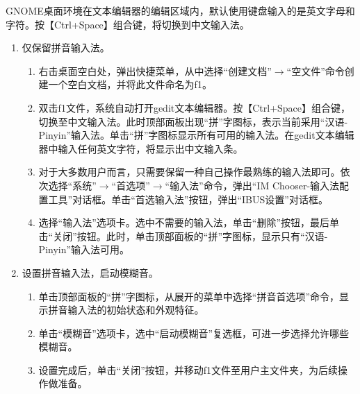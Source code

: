 GNOME桌面环境在文本编辑器的编辑区域内，默认使用键盘输入的是英文字母和字符。按【Ctrl+Space】组合键，将切换到中文输入法。
\begin{enumerate}
  \item 仅保留拼音输入法。
    \begin{enumerate}
      \item 右击桌面空白处，弹出快捷菜单，从中选择“创建文档”$\rightarrow$“空文件”命令创建一个空白文档，并将此文件命名为f1。
      \item 双击f1文件，系统自动打开gedit文本编辑器。按【Ctrl+Space】组合键，切换至中文输入法。此时顶部面板出现“拼”字图标，表示当前采用“汉语-Pinyin”输入法。单击“拼”字图标显示所有可用的输入法。在gedit文本编辑器中输入任何英文字符，将显示出中文输入条。
      \item 对于大多数用户而言，只需要保留一种自己操作最熟练的输入法即可。依次选择“系统”$\rightarrow$“首选项”$\rightarrow$“输入法”命令，弹出“IM Chooser-输入法配置工具”对话框。单击“首选输入法”按钮，弹出“IBUS设置”对话框。
      \item 选择“输入法”选项卡。选中不需要的输入法，单击“删除”按钮，最后单击“关闭”按钮。此时，单击顶部面板的“拼”字图标，显示只有“汉语-Pinyin”输入法可用。
    \end{enumerate}
  \item 设置拼音输入法，启动模糊音。
    \begin{enumerate}
      \item 单击顶部面板的“拼”字图标，从展开的菜单中选择“拼音首选项”命令，显示拼音输入法的初始状态和外观特征。
      \item 单击“模糊音”选项卡，选中“启动模糊音”复选框，可进一步选择允许哪些模糊音。
      \item 设置完成后，单击“关闭”按钮，并移动f1文件至用户主文件夹，为后续操作做准备。
    \end{enumerate}
\end{enumerate}

